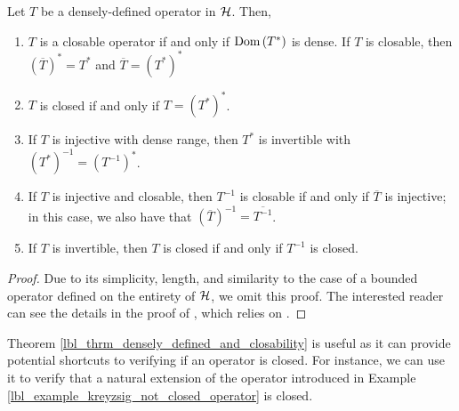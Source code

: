 \begin{theorem}\label{lbl_thrm_densely_defined_and_closability}
  Let $T$ be a densely-defined operator in $\mathcal{H}$. Then,
  \begin{enumerate}[label = (\alph*)]
    \item $T$ is a closable operator if and only if $\operatorname{Dom}\left(T^*\right)$ is dense. If $T$ is closable, then $\left( \overline{T} \right)^* = T^*$ and $\overline{T} = (T^*)^*$
    \item $T$ is closed if and only if $T = (T^*)^*$.
    \item If $T$ is injective with dense range, then $T^*$ is invertible with $(T^*)^{-1} = \left( T^{-1} \right)^*$.
    \item If $T$ is injective and closable, then $T^{-1}$ is closable if and only if $\overline{T}$ is injective; in this case, we also have that $\left( \overline{T} \right)^{-1} = \overline{T^{-1}}$.
    \item If $T$ is invertible, then $T$ is closed if and only if $T^{-1}$ is closed.
  \end{enumerate}
\end{theorem}
\begin{proof}
  Due to its simplicity, length, and similarity to the case of a bounded operator defined on the entirety of $\mathcal{H}$, we omit this proof. The interested reader can see the details in the proof of {\cite[Theorem 1.8]{konrad}}, which relies on {\cite[Lemma 1.10]{konrad}}.
\end{proof}

Theorem \eqref{lbl_thrm_densely_defined_and_closability} is useful as it can provide potential shortcuts to verifying if an operator is closed. For instance, we can use it to verify that a natural extension of the operator introduced in Example \eqref{lbl_example_kreyzsig_not_closed_operator} is closed.

